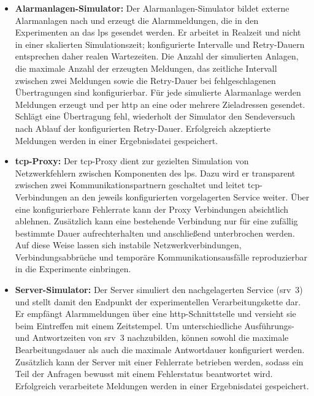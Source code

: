 \begin{itemize}
    \item \textbf{Alarmanlagen-Simulator:} Der Alarmanlagen-Simulator bildet externe Alarmanlagen nach und erzeugt die Alarmmeldungen, die in den Experimenten an das \gls{lps} gesendet werden. Er arbeitet in Realzeit und nicht in einer skalierten Simulationszeit; konfigurierte Intervalle und Retry-Dauern entsprechen daher realen Wartezeiten. Die Anzahl der simulierten Anlagen, die maximale Anzahl der erzeugten Meldungen, das zeitliche Intervall zwischen zwei Meldungen sowie die Retry-Dauer bei fehlgeschlagenen Übertragungen sind konfigurierbar. Für jede simulierte Alarmanlage werden Meldungen erzeugt und per \gls{http} an eine oder mehrere Zieladressen gesendet. Schlägt eine Übertragung fehl, wiederholt der Simulator den Sendeversuch nach Ablauf der konfigurierten Retry-Dauer. Erfolgreich akzeptierte Meldungen werden in einer Ergebnisdatei gespeichert.

    \item \textbf{\gls{tcp}-Proxy:} Der \gls{tcp}-Proxy dient zur gezielten Simulation von Netzwerkfehlern zwischen Komponenten des \gls{lps}. Dazu wird er transparent zwischen zwei Kommunikationspartnern geschaltet und leitet \gls{tcp}-Verbindungen an den jeweils konfigurierten vorgelagerten Service weiter. Über eine konfigurierbare Fehlerrate kann der Proxy Verbindungen absichtlich ablehnen. Zusätzlich kann eine bestehende Verbindung nur für eine zufällig bestimmte Dauer aufrechterhalten und anschließend unterbrochen werden. Auf diese Weise lassen sich instabile Netzwerkverbindungen, Verbindungsabbrüche und temporäre Kommunikationsausfälle reproduzierbar in die Experimente einbringen.

    \item \textbf{Server-Simulator:} Der Server simuliert den nachgelagerten Service \newline (\gls{srv}~3) und stellt damit den Endpunkt der experimentellen Verarbeitungskette dar. Er empfängt Alarmmeldungen über eine \gls{http}-Schnitt\-stel\-le und versieht sie beim Eintreffen mit einem Zeitstempel. Um unterschiedliche Ausführungs- und Antwortzeiten von \gls{srv}~3 nachzubilden, können sowohl die maximale Bearbeitungsdauer als auch die maximale Antwortdauer konfiguriert werden. Zusätzlich kann der Server mit einer Fehlerrate betrieben werden, sodass ein Teil der Anfragen bewusst mit einem Fehlerstatus beantwortet wird. Erfolgreich verarbeitete Meldungen werden in einer Ergebnisdatei gespeichert.


\end{itemize}

